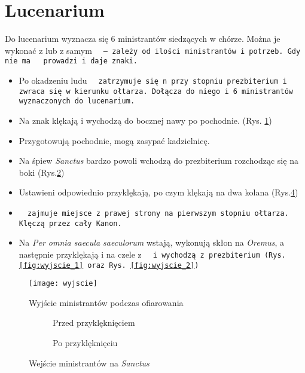 	\section{Lucenarium}
	
		Do lucenarium wyznacza się 6 ministrantów siedzących w chórze. Można je	wykonać z  lub z samym \tt~ – zależy od ilości ministrantów i potrzeb. Gdy nie ma  \tt~ prowadzi i daje znaki.\\
		
		\begin{itemize}
			\item Po okadzeniu ludu \tt~ zatrzymuje się n przy stopniu prezbiterium i zwraca się w kierunku ołtarza. Dołącza do niego  i 6 ministrantów wyznaczonych do lucenarium. 
			\item Na znak  klękają i wychodzą do bocznej nawy po pochodnie.	(Rys. \ref{fig:wyjscie})	
			\item Przygotowują pochodnie, mogą zasypać kadzielnicę. 
			\item Na śpiew \textit{Sanctus} bardzo powoli wchodzą do prezbiterium rozchodząc się na boki (Rys.\ref{fig:wejscie_1})
			\item Ustawieni odpowiednio przyklękają, po czym klękają na dwa kolana (Rys.\ref{fig:wejscie_2})			
			\item \tt~ zajmuje miejsce z prawej strony na pierwszym stopniu ołtarza. Klęczą przez cały Kanon. 
			\item Na \textit{Per omnia saecula saeculorum} wstają, wykonują skłon na \textit{Oremus}, a następnie przyklękają i na czele z \tt~ i  wychodzą z prezbiterium (Rys. \ref{fig:wyjscie_1} oraz Rys. \ref{fig:wyjscie_2})
		\end{itemize}
	
		\begin{figure}[h]
			\centering
			\texttt{[image: wyjscie]}
			\caption{Wyjście ministrantów podczas ofiarowania}
			\label{fig:wyjscie}
		\end{figure}
		
		\begin{figure}[ht]
			\begin{subfigure}[t]{.5\linewidth}
				\centering\usebox{\imagebox}
				\caption{Przed przyklęknięciem}
				\label{fig:wejscie_1}
			\end{subfigure}\qquad
			\begin{subfigure}[t]{.5\linewidth}
				\centering{}%
				\caption{Po przyklęknięciu}
				\label{fig:wejscie_2}
			\end{subfigure}
			\caption{Wejście ministrantów na \textit{Sanctus}}
		\end{figure}
		
